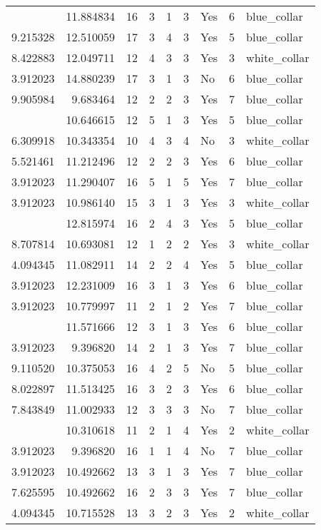 \documentclass[
]{article}
\begin{document}
\begin{longtable}[t]{rrrrrllrl}
\addlinespace
3.912023 & 11.884834 & 16 & 3 & 1 & 3 & Yes & 6 & blue\_collar\\
9.215328 & 12.510059 & 17 & 3 & 4 & 3 & Yes & 5 & blue\_collar\\
8.422883 & 12.049711 & 12 & 4 & 3 & 3 & Yes & 3 & white\_collar\\
3.912023 & 14.880239 & 17 & 3 & 1 & 3 & No & 6 & blue\_collar\\
9.905984 & 9.683464 & 12 & 2 & 2 & 3 & Yes & 7 & blue\_collar\\
\addlinespace
3.912023 & 10.646615 & 12 & 5 & 1 & 3 & Yes & 5 & blue\_collar\\
6.309918 & 10.343354 & 10 & 4 & 3 & 4 & No & 3 & white\_collar\\
5.521461 & 11.212496 & 12 & 2 & 2 & 3 & Yes & 6 & blue\_collar\\
3.912023 & 11.290407 & 16 & 5 & 1 & 5 & Yes & 7 & blue\_collar\\
3.912023 & 10.986140 & 15 & 3 & 1 & 3 & Yes & 3 & white\_collar\\
\addlinespace
11.503380 & 12.815974 & 16 & 2 & 4 & 3 & Yes & 5 & blue\_collar\\
8.707814 & 10.693081 & 12 & 1 & 2 & 2 & Yes & 3 & white\_collar\\
4.094345 & 11.082911 & 14 & 2 & 2 & 4 & Yes & 5 & blue\_collar\\
3.912023 & 12.231009 & 16 & 3 & 1 & 3 & Yes & 6 & blue\_collar\\
3.912023 & 10.779997 & 11 & 2 & 1 & 2 & Yes & 7 & blue\_collar\\
\addlinespace
3.912023 & 11.571666 & 12 & 3 & 1 & 3 & Yes & 6 & blue\_collar\\
3.912023 & 9.396820 & 14 & 2 & 1 & 3 & Yes & 7 & blue\_collar\\
9.110520 & 10.375053 & 16 & 4 & 2 & 5 & No & 5 & blue\_collar\\
8.022897 & 11.513425 & 16 & 3 & 2 & 3 & Yes & 6 & blue\_collar\\
7.843849 & 11.002933 & 12 & 3 & 3 & 3 & No & 7 & blue\_collar\\
\addlinespace
3.912023 & 10.310618 & 11 & 2 & 1 & 4 & Yes & 2 & white\_collar\\
3.912023 & 9.396820 & 16 & 1 & 1 & 4 & No & 7 & blue\_collar\\
3.912023 & 10.492662 & 13 & 3 & 1 & 3 & Yes & 7 & blue\_collar\\
7.625595 & 10.492662 & 16 & 2 & 3 & 3 & Yes & 7 & blue\_collar\\
4.094345 & 10.715528 & 13 & 3 & 2 & 3 & Yes & 2 & white\_collar\\

\end{longtable}
\end{document}
